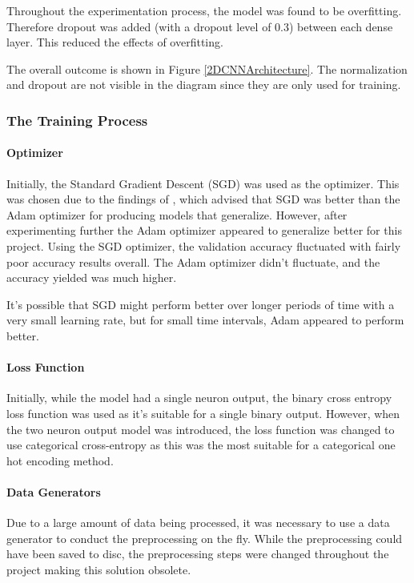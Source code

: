\documentclass[10pt,a4paper]{article}
\begin{document}
                Throughout the experimentation process, the model was found to be overfitting. Therefore dropout was added (with a dropout level of 0.3) between each dense layer. This reduced the effects of overfitting.

                The overall outcome is shown in Figure \ref{2DCNNArchitecture}. The normalization and dropout are not visible in the diagram since they are only used for training.


            \subsubsection{The Training Process}
                \paragraph{Optimizer}
                Initially, the Standard Gradient Descent (SGD) was used as the optimizer. This was chosen due to the findings of \cite{SGDBetterThanAdamForImageClassification},
                which advised that SGD was better than the Adam optimizer for producing models that generalize. However, after experimenting further the Adam optimizer appeared to generalize better for this project. Using the SGD optimizer, the validation accuracy fluctuated with fairly poor accuracy results overall. The Adam optimizer didn't fluctuate, and the accuracy yielded was much higher.

                It's possible that SGD might perform better over longer periods of time with a very small learning rate, but for small time intervals, Adam appeared to perform better.


                \paragraph{Loss Function}
                Initially, while the model had a single neuron output, the binary cross entropy loss function was used as it's suitable for a single binary output.
                However, when the two neuron output model was introduced, the loss function was changed to use categorical cross-entropy as this was the most suitable
                for a categorical one hot encoding method.

                \paragraph{Data Generators}
                Due to a large amount of data being processed, it was necessary to use a data generator to conduct the preprocessing on the fly. While the preprocessing could have been saved to disc, the preprocessing steps were changed throughout the project making this solution obsolete.
\end{document}
